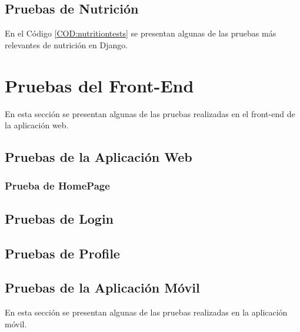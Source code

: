 \newpage
\subsection{Pruebas de Nutrición}
En el Código \ref{COD:nutritiontests} se presentan algunas de las pruebas más relevantes de nutrición en Django.

\newpage

\section{Pruebas del Front-End\label{SEC:PRUEBASFRONTEND}}
En esta sección se presentan algunas de las pruebas realizadas en el front-end de la aplicación web.

\subsection{Pruebas de la Aplicación Web}
\subsubsection{Prueba de HomePage}

\newpage

\subsection{Pruebas de Login}

\newpage

\subsection{Pruebas de Profile}

\newpage

\subsection{Pruebas de la Aplicación Móvil\label{SEC:PRUEBASMOVIL}}
En esta sección se presentan algunas de las pruebas realizadas en la aplicación móvil.

